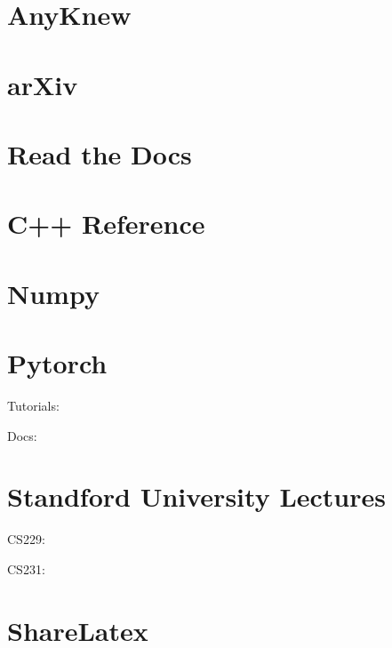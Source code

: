 \documentclass[letterpaper,10pt,english]{sphinxmanual}
\begin{document}
\section{AnyKnew}
\label{\detokenize{link/index:anyknew}}


\section{arXiv}
\label{\detokenize{link/index:arxiv}}


\section{Read the Docs}
\label{\detokenize{link/index:read-the-docs}}


\section{C++ Reference}
\label{\detokenize{link/index:c-reference}}


\section{Numpy}
\label{\detokenize{link/index:numpy}}


\section{Pytorch}
\label{\detokenize{link/index:pytorch}}
Tutorials: 

Docs: 


\section{Standford University Lectures}
\label{\detokenize{link/index:standford-university-lectures}}
CS229: 

CS231: 


\section{ShareLatex}
\label{\detokenize{link/index:sharelatex}}
\end{document}
